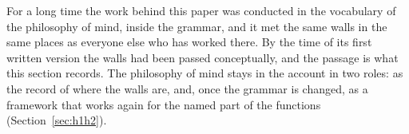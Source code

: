 For a long time the work behind this paper was conducted in the vocabulary of the philosophy of mind,
inside the grammar, and it met the same walls in the same places as everyone else who has worked
there. By the time of its first written version the walls had been passed conceptually, and the
passage is what this section records. The philosophy of mind stays in the account in two roles: as
the record of where the walls are, and, once the grammar is changed, as a framework that works again
for the named part of the functions (Section~\ref{sec:h1h2}).
